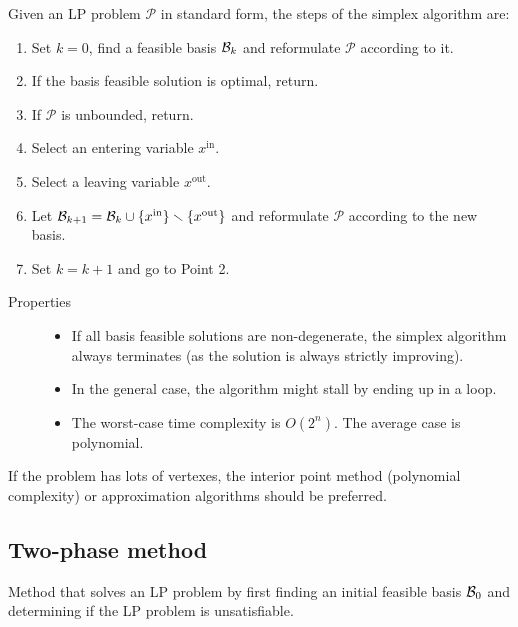 Given an LP problem $\mathcal{P}$ in standard form, the steps of the simplex algorithm are:
\begin{enumerate}
    \item Set $k=0$, find a feasible basis $\mathcal{B}_k$ and reformulate $\mathcal{P}$ according to it.
    \item If the basis feasible solution is optimal, return.
    \item If $\mathcal{P}$ is unbounded, return.
    \item Select an entering variable $x^\text{in}$.
    \item Select a leaving variable $x^\text{out}$.
    \item Let $\mathcal{B}_{k+1} = \mathcal{B}_k \cup \{ x^\text{in} \} \smallsetminus \{ x^\text{out} \}$ and reformulate $\mathcal{P}$ according to the new basis.
    \item Set $k = k + 1$ and go to Point 2.
\end{enumerate}

\begin{description}
    \item[Properties] \phantom{}
        \begin{itemize}
            \item If all basis feasible solutions are non-degenerate, the simplex algorithm always terminates (as the solution is always strictly improving).
            \item In the general case, the algorithm might stall by ending up in a loop.
            \item The worst-case time complexity is $O(2^n)$. The average case is polynomial.
        \end{itemize}
\end{description}

\begin{remark}
    If the problem has lots of vertexes, the interior point method (polynomial complexity) or approximation algorithms should be preferred.
\end{remark}


\subsection{Two-phase method}

Method that solves an LP problem by first finding an initial feasible basis $\mathcal{B}_0$ and determining if the LP problem is unsatisfiable.

